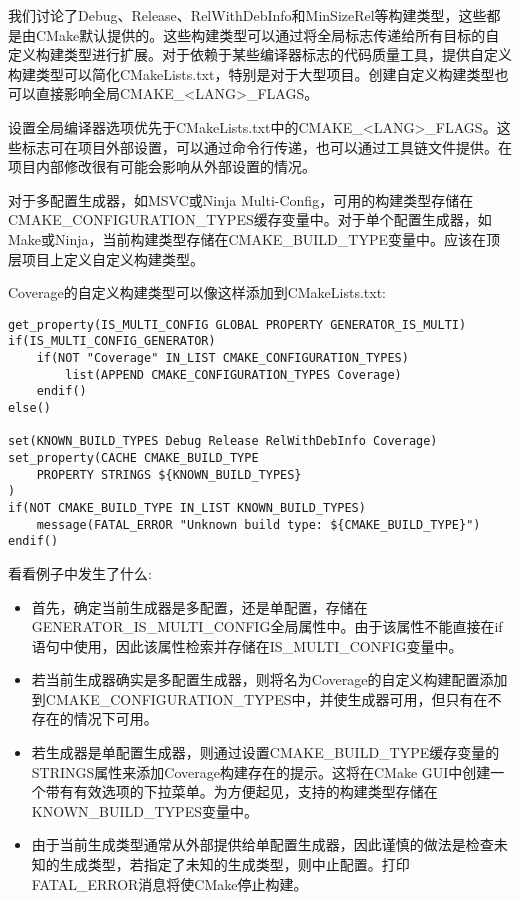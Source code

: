
我们讨论了Debug、Release、RelWithDebInfo和MinSizeRel等构建类型，这些都是由CMake默认提供的。这些构建类型可以通过将全局标志传递给所有目标的自定义构建类型进行扩展。对于依赖于某些编译器标志的代码质量工具，提供自定义构建类型可以简化CMakeLists.txt，特别是对于大型项目。创建自定义构建类型也可以直接影响全局CMAKE\_<LANG>\_FLAGS。

\begin{tcolorbox}[colback=blue!5!white,colframe=blue!75!black,title=别覆盖CMAKE\_<LANG>\_FLAGS]
设置全局编译器选项优先于CMakeLists.txt中的CMAKE\_<LANG>\_FLAGS。这些标志可在项目外部设置，可以通过命令行传递，也可以通过工具链文件提供。在项目内部修改很有可能会影响从外部设置的情况。
\end{tcolorbox}

对于多配置生成器，如MSVC或Ninja Multi-Config，可用的构建类型存储在CMAKE\_CONFIGURATION\_TYPES缓存变量中。对于单个配置生成器，如Make或Ninja，当前构建类型存储在CMAKE\_BUILD\_TYPE变量中。应该在顶层项目上定义自定义构建类型。

Coverage的自定义构建类型可以像这样添加到CMakeLists.txt:

\begin{lstlisting}[style=styleCMake]
get_property(IS_MULTI_CONFIG GLOBAL PROPERTY GENERATOR_IS_MULTI)
if(IS_MULTI_CONFIG_GENERATOR)
	if(NOT "Coverage" IN_LIST CMAKE_CONFIGURATION_TYPES)
		list(APPEND CMAKE_CONFIGURATION_TYPES Coverage)
	endif()
else()

set(KNOWN_BUILD_TYPES Debug Release RelWithDebInfo Coverage)
set_property(CACHE CMAKE_BUILD_TYPE
	PROPERTY STRINGS ${KNOWN_BUILD_TYPES}
)
if(NOT CMAKE_BUILD_TYPE IN_LIST KNOWN_BUILD_TYPES)
	message(FATAL_ERROR "Unknown build type: ${CMAKE_BUILD_TYPE}")
endif()
\end{lstlisting}

看看例子中发生了什么:

\begin{itemize}
\item 
首先，确定当前生成器是多配置，还是单配置，存储在GENERATOR\_IS\_MULTI\_CONFIG全局属性中。由于该属性不能直接在if语句中使用，因此该属性检索并存储在IS\_MULTI\_CONFIG变量中。

\item 
若当前生成器确实是多配置生成器，则将名为Coverage的自定义构建配置添加到CMAKE\_CONFIGURATION\_TYPES中，并使生成器可用，但只有在不存在的情况下可用。

\item 
若生成器是单配置生成器，则通过设置CMAKE\_BUILD\_TYPE缓存变量的STRINGS属性来添加Coverage构建存在的提示。这将在CMake GUI中创建一个带有有效选项的下拉菜单。为方便起见，支持的构建类型存储在KNOWN\_BUILD\_TYPES变量中。

\item 
由于当前生成类型通常从外部提供给单配置生成器，因此谨慎的做法是检查未知的生成类型，若指定了未知的生成类型，则中止配置。打印FATAL\_ERROR消息将使CMake停止构建。
\end{itemize}

